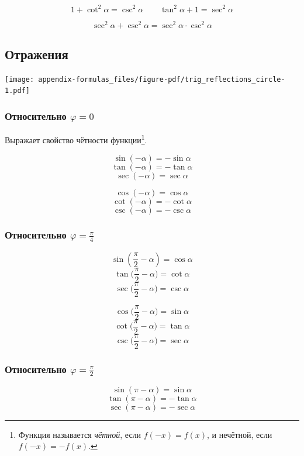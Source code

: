 \documentclass[
  letterpaper,
]{scrbook}
\theoremstyle{definition}
\theoremstyle{remark}
\begin{document}
\[
1 + \cot^2 \alpha = \csc^2 \alpha \qquad
\tan^2 \alpha + 1 = \sec ^2 \alpha
\]

\[
\sec^2 \alpha + \csc^2 \alpha = \sec^2 \alpha \cdot \csc^2 \alpha
\]

\subsection{Отражения}\label{trig_reflections}

\texttt{[image: appendix-formulas\_files/figure-pdf/trig\_reflections\_circle-1.pdf]}

\subsubsection{\texorpdfstring{Относительно
\(\varphi = 0\)}{Относительно \textbackslash varphi = 0}}\label{trig_reflections_0}

Выражает свойство чётности функции\footnote{Функция называется
  \emph{чётной}, если \(f(-x) = f(x)\), и нечётной, если
  \(f(-x) = -f(x)\).}.

\[\sin (-\alpha) = -\sin \alpha\] \[\tan (-\alpha) = -\tan \alpha\]
\[\sec (-\alpha) = \sec \alpha\]

\[\cos (-\alpha) = \cos \alpha\] \[\cot (-\alpha) = -\cot \alpha\]
\[\csc (-\alpha) = -\csc \alpha\]

\subsubsection{\texorpdfstring{Относительно
\(\varphi = \frac{\pi}{4}\)}{Относительно \textbackslash varphi = \textbackslash frac\{\textbackslash pi\}\{4\}}}\label{trig_reflections_pi4}

\[\sin (\frac{\pi}{2}-\alpha) = \cos \alpha\]
\[\tan \Big(\frac{\pi}{2}-\alpha\Big) = \cot \alpha\]
\[\sec \Big(\frac{\pi}{2}-\alpha\Big) = \csc \alpha\]

\[\cos \Big(\frac{\pi}{2}-\alpha\Big) = \sin \alpha\]
\[\cot \Big(\frac{\pi}{2}-\alpha\Big) = \tan \alpha\]
\[\csc \Big(\frac{\pi}{2}-\alpha\Big) = \sec \alpha\]

\subsubsection{\texorpdfstring{Относительно
\(\varphi = \frac{\pi}{2}\)}{Относительно \textbackslash varphi = \textbackslash frac\{\textbackslash pi\}\{2\}}}\label{trig_reflections_pi2}

\[\sin (\pi-\alpha) = \sin \alpha\] \[\tan (\pi-\alpha) = -\tan \alpha\]
\[\sec (\pi-\alpha) = -\sec \alpha\]
\end{document}
